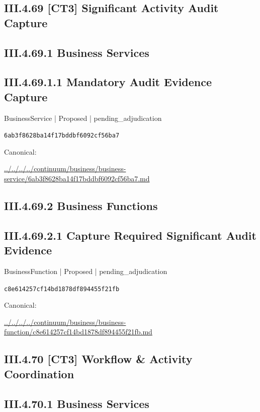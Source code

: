 \documentclass[10pt,a4paper]{article}
\begin{document}
\subsection*{III.4.69 [CT3] Significant Activity Audit Capture}
\subsection*{III.4.69.1 Business Services}
\subsection*{III.4.69.1.1 Mandatory Audit Evidence Capture}
{\small BusinessService | Proposed | pending\_adjudication}\par
\texttt{6ab3f8628ba14f17bddbf6092cf56ba7}\par
Canonical: \par
{\footnotesize\url{../../../../continuum/business/business-service/6ab3f8628ba14f17bddbf6092cf56ba7.md}}\par
\subsection*{III.4.69.2 Business Functions}
\subsection*{III.4.69.2.1 Capture Required Significant Audit Evidence}
{\small BusinessFunction | Proposed | pending\_adjudication}\par
\texttt{c8e614257cf14bd1878df894455f21fb}\par
Canonical: \par
{\footnotesize\url{../../../../continuum/business/business-function/c8e614257cf14bd1878df894455f21fb.md}}\par
\subsection*{III.4.70 [CT3] Workflow \& Activity Coordination}
\subsection*{III.4.70.1 Business Services}
\end{document}
